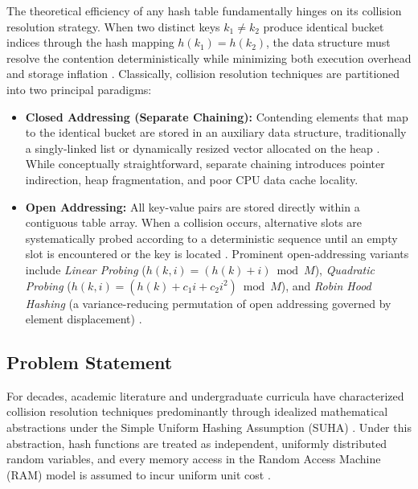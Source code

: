\documentclass[conference]{IEEEtran}
\begin{document}
The theoretical efficiency of any hash table fundamentally hinges on its collision resolution strategy. When two distinct keys $k_1 \neq k_2$ produce identical bucket indices through the hash mapping $h(k_1) = h(k_2)$, the data structure must resolve the contention deterministically while minimizing both execution overhead and storage inflation \cite{carter1979}. Classically, collision resolution techniques are partitioned into two principal paradigms:
\begin{itemize}
  \item \textbf{Closed Addressing (Separate Chaining):} Contending elements that map to the identical bucket are stored in an auxiliary data structure, traditionally a singly-linked list or dynamically resized vector allocated on the heap \cite{knuth1998, sedgewick2011}. While conceptually straightforward, separate chaining introduces pointer indirection, heap fragmentation, and poor CPU data cache locality.
  \item \textbf{Open Addressing:} All key-value pairs are stored directly within a contiguous table array. When a collision occurs, alternative slots are systematically probed according to a deterministic sequence until an empty slot is encountered or the key is located \cite{knuth1963, brent1973}. Prominent open-addressing variants include \emph{Linear Probing} ($h(k, i) = (h(k) + i) \bmod M$), \emph{Quadratic Probing} ($h(k, i) = (h(k) + c_1 i + c_2 i^2) \bmod M$), and \emph{Robin Hood Hashing} (a variance-reducing permutation of open addressing governed by element displacement) \cite{celis1985, celis1986}.
\end{itemize}

\subsection{Problem Statement}

For decades, academic literature and undergraduate curricula have characterized collision resolution techniques predominantly through idealized mathematical abstractions under the Simple Uniform Hashing Assumption (SUHA) \cite{clrs2022, mitzenmacher2017}. Under this abstraction, hash functions are treated as independent, uniformly distributed random variables, and every memory access in the Random Access Machine (RAM) model is assumed to incur uniform unit cost \cite{vitter2001, frigo1999}.
\end{document}
